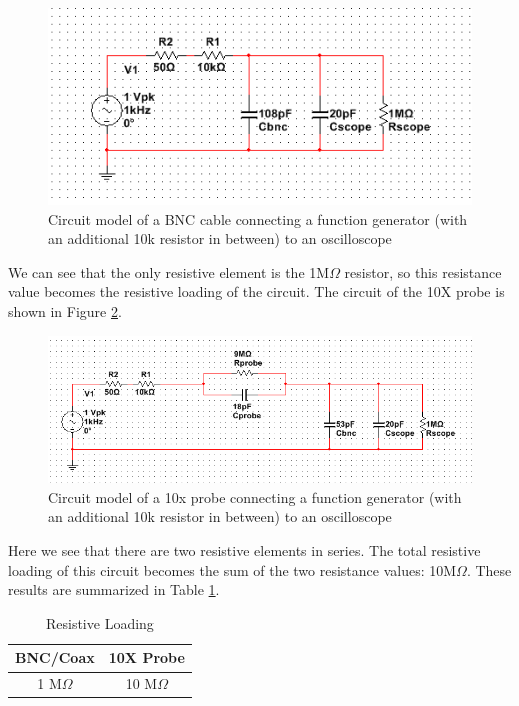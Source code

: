 \documentclass[12pt,letterpaper]{report}
\begin{document}
\begin{figure}
	\centering
	\includegraphics[width=\linewidth, keepaspectratio=true]{lab1_images/BNC_circuit.png} 
	\caption{Circuit model of a BNC cable connecting a function generator (with an additional 10k resistor in between) to an oscilloscope}
	\label{fig:bnc_circuit}
\end{figure}

We can see that the only resistive element is the 1M$\Omega$ resistor, so this resistance value becomes the resistive loading of the circuit. The circuit of the 10X probe is shown in Figure \ref{fig:probe_circuit}.

\begin{figure}
	\centering
	\includegraphics[width=\linewidth, keepaspectratio=true]{lab1_images/10x_circuit.png} 
	\caption{Circuit model of a 10x probe connecting a function generator (with an additional 10k resistor in between) to an oscilloscope}
	\label{fig:probe_circuit}
\end{figure}
 
Here we see that there are two resistive elements in series. The total resistive loading of this circuit becomes the sum of the two resistance values: 10M$\Omega$. These results are summarized in Table \ref{table:ResistiveLoading}.

\begin{center}
\begin{table}[ht]
\caption{Resistive Loading} %
\centering 
	\begin{tabular}{| c | c |}
	\hline
	
	BNC/Coax & 10X Probe \\
	\hline
	1 M$\Omega $ & 10 M$\Omega$ \\

	\hline
	\end{tabular}
	\label{table:ResistiveLoading}
\end{table}
\end{center}
\end{document}
